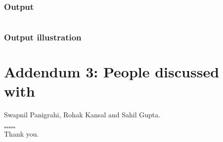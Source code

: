 \documentclass{article}
\begin{document}
\subsubsection*{Output}
\inputminted{sh}{./out4}
\subsubsection*{Output illustration}



\section*{Addendum 3: People discussed with}

Swapnil Panigrahi, Rohak Kansal and Sahil Gupta.


\vspace*{\fill}
\begin{center}
    $\square \square \square \square \square$
    \\
    Thank you.
\end{center}
\vspace*{\fill}
\end{document}
